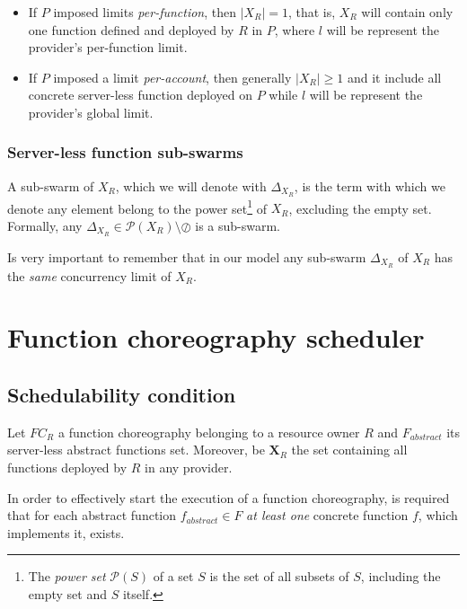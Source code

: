 \documentclass[10pt,a4paper]{article}
\theoremstyle{definition}
\begin{document}
\begin{itemize}

\item If $P$ imposed limits \textit{per-function}, then $|X_{R}| = 1$, that is, $X_{R}$ will contain only one function defined and deployed by $R$ in $P$, where $l$ will be represent the provider's per-function limit.

\item If $P$ imposed a limit \textit{per-account}, then generally $|X_{R}| \geq 1$ and it include all concrete server-less function deployed on $P$ while $l$ will be represent the provider's global limit. 
\end{itemize}

\subsubsection{Server-less function sub-swarms}

A sub-swarm of ${X_{R}}$, which we will denote with $\Delta_{X_{R}}$, is the term with which we denote any element belong to the power set\footnote{The \textit{power set} $\mathcal{P}(S)$ of a set $S$ is the set of all subsets of $S$, including the empty set and $S$ itself.} of $X_{R}$, excluding the empty set. Formally, any $\Delta_{X_{R}} \in \mathcal{P}(X_{R}) \setminus \oslash$ is a sub-swarm.

Is very important to remember that in our model any sub-swarm $\Delta_{X_{R}}$ of ${X_{R}}$ has the \textit{same} concurrency limit of ${X_{R}}$.

\section{Function choreography scheduler}

\subsection{Schedulability condition}

Let $FC_R$ a function choreography belonging to a resource owner $R$ and $F_{abstract}$ its server-less abstract functions set. Moreover, be $\textbf{X}_R$ the set containing all functions deployed by $R$ in any provider.

In order to effectively start the execution of a function choreography, is required that for each abstract function $f_{abstract} \in F$ \textit{at least one} concrete function $f$, which implements it, exists.
\end{document}
